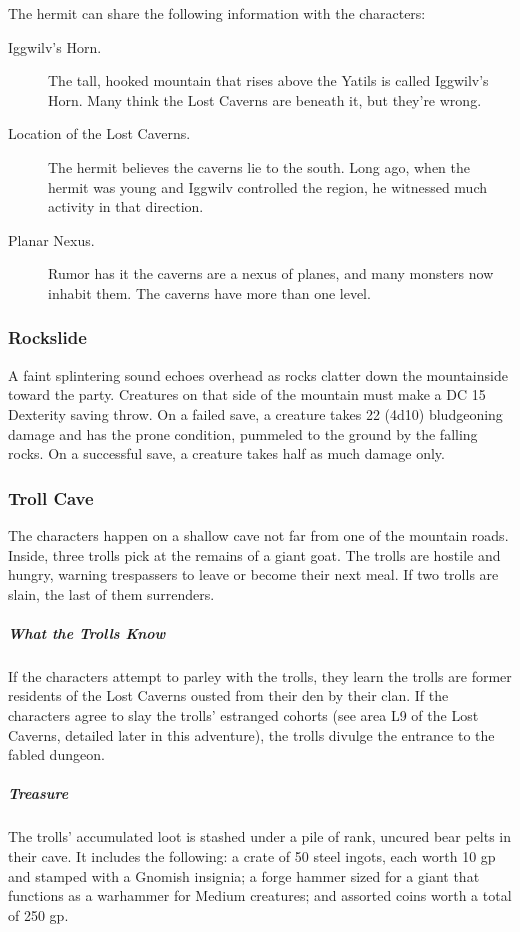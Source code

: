 \documentclass[10pt,a4paper,twoside,bg=print,twocolumn,openany,nodeprecatedcode]{dndbook}
\begin{document}
The hermit can share the following information with the characters:


\begin{description}
\item[Iggwilv's Horn.]
The tall, hooked mountain that rises above the Yatils is called Iggwilv's Horn. Many think the Lost Caverns are beneath it, but they're wrong.
\item[Location of the Lost Caverns.]
The hermit believes the caverns lie to the south. Long ago, when the hermit was young and Iggwilv controlled the region, he witnessed much activity in that direction.
\item[Planar Nexus.]
Rumor has it the caverns are a nexus of planes, and many monsters now inhabit them. The caverns have more than one level.
\end{description}

\subsubsection{Rockslide}
A faint splintering sound echoes overhead as rocks clatter down the mountainside toward the party. Creatures on that side of the mountain must make a DC 15 Dexterity saving throw. On a failed save, a creature takes 22 (4d10) bludgeoning damage and has the prone condition, pummeled to the ground by the falling rocks. On a successful save, a creature takes half as much damage only.

\subsubsection{Troll Cave}
The characters happen on a shallow cave not far from one of the mountain roads. Inside, three trolls pick at the remains of a giant goat. The trolls are hostile and hungry, warning trespassers to leave or become their next meal. If two trolls are slain, the last of them surrenders.

\subparagraph{What the Trolls Know}
If the characters attempt to parley with the trolls, they learn the trolls are former residents of the Lost Caverns ousted from their den by their clan. If the characters agree to slay the trolls' estranged cohorts (see area L9 of the Lost Caverns, detailed later in this adventure), the trolls divulge the entrance to the fabled dungeon.

\subparagraph{Treasure}
The trolls' accumulated loot is stashed under a pile of rank, uncured bear pelts in their cave. It includes the following: a crate of 50 steel ingots, each worth 10 gp and stamped with a Gnomish insignia; a forge hammer sized for a giant that functions as a warhammer for Medium creatures; and assorted coins worth a total of 250 gp.
\end{document}
